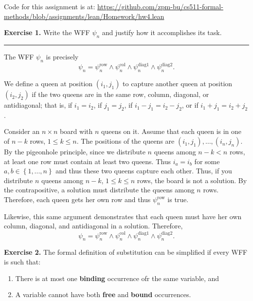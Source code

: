 \documentclass{article}
\newcommand*{\Break}{\vspace{0.2cm}\hrule{}\vspace{0.2cm}}
\begin{document}
 \maketitle

Code for this assignment is at: \url{https://github.com/zpm-bu/cs511-formal-methods/blob/assignments/lean/Homework/hw4.lean}

\noindent\textbf{Exercise 1.} Write the WFF $\psi_n$ and justify how
it accomplishes its task.

\Break{}

The WFF $\psi_n$ is precisely
\[
  \psi_n = \psi^\text{row}_n \wedge \psi^\text{col}_n \wedge
  \psi^\text{diag1}_n \wedge \psi^\text{diag2}_n.
\]

We define a queen at position $(i_1, j_1)$ to capture another queen at
position $(i_2, j_2)$ if the two queens are in the same row, column, diagonal,
or antidiagonal; that is, if $i_1 = i_2$, if $j_1 = j_2$, if $i_1 - j_1 = i_2
- j_2$, or if $i_1 + j_1 = i_2 + j_2$.

Consider an $n \times n$ board with $n$ queens on it. Assume that each queen
is in one of $n - k$ rows, $1 \leq k \leq n$. The positions of the queens are
$(i_1, j_1), \dots, (i_n, j_n)$. By the pigeonhole principle, since we
distribute $n$ queens among $n - k < n$ rows, at least one row must contain
at least two queens. Thus $i_a = i_b$ for some $a, b \in \left\{ 1, ..., n
\right\}$ and thus these two queens capture each other. Thus, if you
distribute $n$ queens among $n - k$, $1 \leq k \leq n$ rows,
the board is not a solution. By the contrapositive, a solution must distribute
the queens among $n$ rows. Therefore, each queen gets her own row and thus
$\psi^\text{row}_n$ is true.

Likewise, this same argument demonstrates that each queen must have her own
column, diagonal, and antidiagonal in a solution. Therefore,
\[
  \psi_n = \psi^\text{row}_n \wedge \psi^\text{col}_n \wedge
  \psi^\text{diag1}_n \wedge \psi^\text{diag2}_n.
\]



\newpage{}



\noindent\textbf{Exercise 2.} The formal definition of substitution can be
simplified if every WFF is such that:
\begin{enumerate}
  \item There is at most one \textbf{binding} occurrence ofr the same variable,
    and
  \item A variable cannot have both \textbf{free} and \textbf{bound}
    occurrences.
\end{enumerate}
\end{document}
